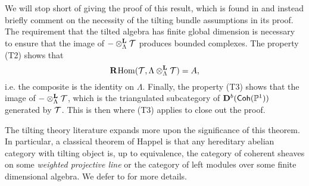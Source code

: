 We will stop short of giving the proof of this result, which is found
in \cite[Theorem~2.1]{craw} and instead briefly comment on the
necessity of the tilting bundle assumptions in its proof.
The requirement that the tilted algebra has finite global dimension
is necessary to ensure that the image of
$\dertensor{\Lambda}{-}{\shf{T}}$ produces bounded complexes.
The property (T2) shows that
\[
  \rightderfunc{\Hom(\shf{T}, \dertensor{\Lambda}{\Lambda}{\shf{T}})} = A,
\]
i.e. the composite is the identity on $\Lambda$.
Finally, the property (T3) shows that the image of
$\dertensor{\Lambda}{-}{\shf{T}}$, which is the triangulated
subcategory of $\dercat[b]{\Coh(\proj{1})}$ generated by $\shf{T}$.
This is then where (T3) applies to close out the proof.

The tilting theory literature expands more upon the significance of
this theorem.
In particular, a classical theorem of Happel is that any hereditary
abelian category with tilting object is, up to equivalence, the
category of coherent sheaves on some \emph{weighted projective line}
or the category of left modules over some finite dimensional algebra.
We defer to \cite{handbook_of_tilting_theory} for more details.
